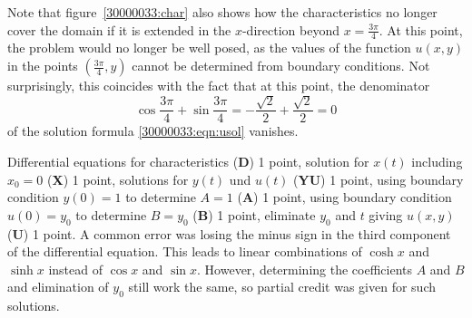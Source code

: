 \begin{diskussion}
Note that figure~\ref{30000033:char} also shows how the characteristics
no longer cover the domain if it is extended in the $x$-direction beyond
$x=\frac{3\pi}{4}$.
At this point, the problem would no longer be well posed, as the values
of the function $u(x,y)$ in the points $(\frac{3\pi}4,y)$ cannot be
determined from boundary conditions.
Not surprisingly, this coincides with the fact that at this point, the
denominator
\[
\cos\frac{3\pi}{4} + \sin\frac{3\pi}{4} 
=
-
\frac{\!\sqrt{2}}2
+
\frac{\!\sqrt{2}}2
=
0
\]
of the solution formula \eqref{30000033:eqn:usol} vanishes.
\end{diskussion}

\begin{bewertung}
Differential equations for characteristics ({\bf D}) 1 point,
solution for $x(t)$ including $x_0=0$ ({\bf X}) 1 point,
solutions for $y(t)$ und $u(t)$ ({\bf YU}) 1 point,
using boundary condition $y(0)=1$ to determine $A=1$ ({\bf A}) 1 point,
using boundary condition $u(0)=y_0$ to determine $B=y_0$ ({\bf B}) 1 point,
eliminate $y_0$ and $t$ giving $u(x,y)$ ({\bf U}) 1 point.
A common error was losing the minus sign in the third component of the
differential equation.
This leads to linear combinations of $\cosh x$ and $\sinh x$ instead
of $\cos x$ and $\sin x$.
However, determining the coefficients $A$ and $B$ and elimination of
$y_0$ still work the same, so partial credit was given for such solutions.
\end{bewertung}



